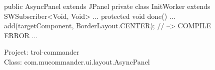 \begin{figure}[H]
\begin{sourcecode}
\begin{javacode}{6}
public AsyncPanel extends JPanel {
	private class InitWorker extends SWSubscriber<Void, Void> {
		...
	    protected void done() {
    	    ...
	        add(targetComponent, BorderLayout.CENTER); // --> COMPILE ERROR
        	...
    	}
	}
}
\end{javacode}
\caption{Project: trol-commander\\ Class: com.mucommander.ui.layout.AsyncPanel}
\label{code:method-name-conflict}
\end{sourcecode}
\end{figure}